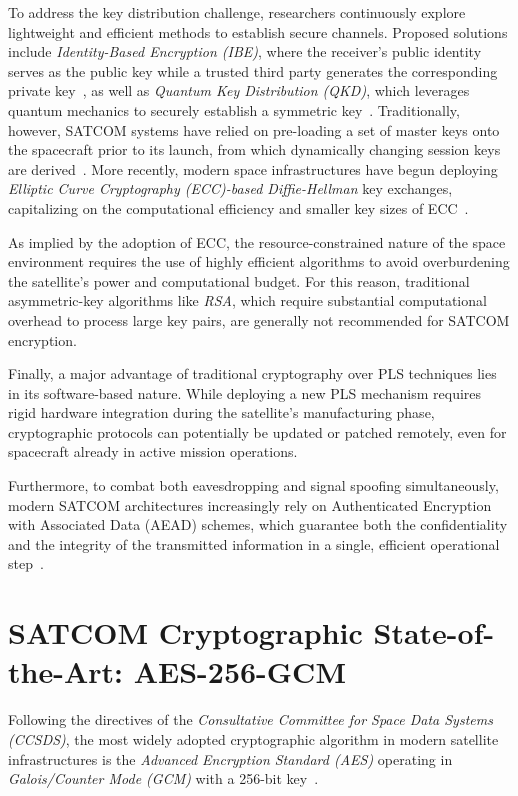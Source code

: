 \documentclass[11pt,a4paper]{report}
\begin{document}
To address the key distribution challenge, researchers continuously explore lightweight and efficient methods to establish secure channels. 
Proposed solutions include \textit{Identity-Based Encryption (IBE)}, where the receiver's public identity serves as the public key while a trusted third party generates the corresponding private key~\cite[pp.~2193--2194]{IBE}, 
as well as \textit{Quantum Key Distribution (QKD)}, which leverages quantum mechanics to securely establish a symmetric key~\cite[p.~5683]{LEO_MEO_GEO}. 
Traditionally, however, SATCOM systems have relied on pre-loading a set of master keys onto the spacecraft prior to its launch, 
from which dynamically changing session keys are derived~\cite{masterSessionKey}. 
More recently, modern space infrastructures have begun deploying \textit{Elliptic Curve Cryptography (ECC)-based Diffie-Hellman} key exchanges, 
capitalizing on the computational efficiency and smaller key sizes of ECC~\cite{diffieHellman}.

As implied by the adoption of ECC, the resource-constrained nature of the space environment requires the use of highly efficient algorithms to avoid overburdening the satellite's power and computational budget. 
For this reason, traditional asymmetric-key algorithms like \textit{RSA}, which require substantial computational overhead to process large key pairs, are generally not recommended for SATCOM encryption.

Finally, a major advantage of traditional cryptography over PLS techniques lies in its software-based nature. 
While deploying a new PLS mechanism requires rigid hardware integration during the satellite's manufacturing phase, 
cryptographic protocols can potentially be updated or patched remotely, even for spacecraft already in active mission operations. 

Furthermore, to combat both eavesdropping and signal spoofing simultaneously, modern SATCOM architectures increasingly rely on Authenticated Encryption with Associated Data (AEAD) schemes, 
which guarantee both the confidentiality and the integrity of the transmitted information in a single, efficient operational step~\cite{AES256-GCM}.

\section{SATCOM Cryptographic State-of-the-Art: AES-256-GCM}
Following the directives of the \textit{Consultative Committee for Space Data Systems (CCSDS)}, 
the most widely adopted cryptographic algorithm in modern satellite infrastructures is the \textit{Advanced Encryption Standard (AES)} operating in \textit{Galois/Counter Mode (GCM)} with a 256-bit key~\cite{AES256-GCM}.
\end{document}
